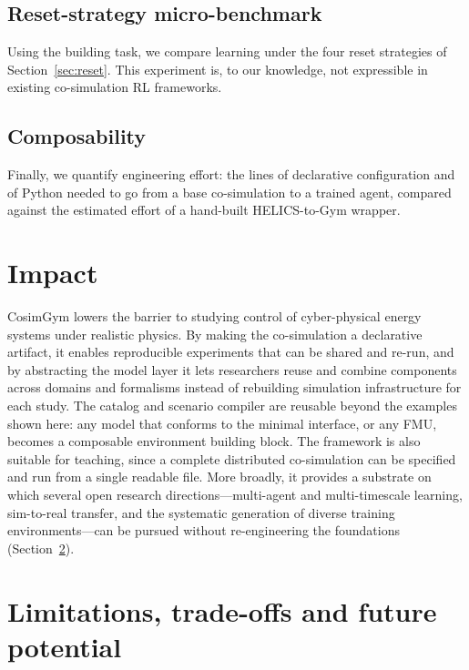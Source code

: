 \documentclass[preprint,12pt]{elsarticle}
\begin{document}
\subsection{Reset-strategy micro-benchmark}
Using the building task, we compare learning under the four reset strategies of
Section~\ref{sec:reset}. This experiment is, to our knowledge, not expressible in
existing co-simulation RL frameworks.

\subsection{Composability}
Finally, we quantify engineering effort: the lines of declarative configuration
and of Python needed to go from a base co-simulation to a trained agent, compared
against the estimated effort of a hand-built HELICS-to-Gym wrapper.

\section{Impact}\label{sec:impact}
CosimGym lowers the barrier to studying control of cyber-physical energy systems
under realistic physics. By making the co-simulation a declarative artifact, it
enables reproducible experiments that can be shared and re-run, and by abstracting
the model layer it lets researchers reuse and combine components across domains and
formalisms instead of rebuilding simulation infrastructure for each study. The
catalog and scenario compiler are reusable beyond the examples shown here: any
model that conforms to the minimal interface, or any FMU, becomes a composable
environment building block. The framework is also suitable for teaching, since a
complete distributed co-simulation can be specified and run from a single readable
file. More broadly, it provides a substrate on which several open research
directions---multi-agent and multi-timescale learning, sim-to-real transfer, and
the systematic generation of diverse training environments---can be pursued without
re-engineering the foundations (Section~\ref{sec:future}).

\section{Limitations, trade-offs and future potential}\label{sec:future}
\end{document}

